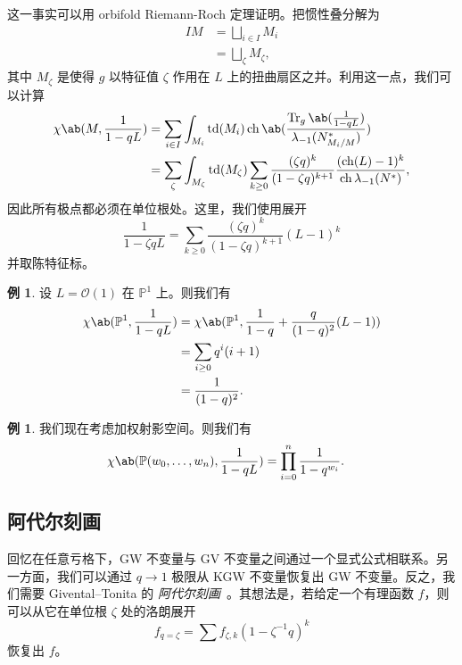 \documentclass{amsart}
\theoremstyle{definition}
\newtheorem{exm}[thm]{例}
\theoremstyle{remark}
\theoremstyle{plain}
\theoremstyle{definition}
\theoremstyle{remark}
\renewcommand{\P}{\mathbb{P}}
\newcommand{\mc}[1]{\mathcal{#1}}
\newcommand{\on}[1]{\operatorname{#1}}
\newcommand{\1}{\mathbf{1}}
\newcommand{\2}{\mathbf{2}}
\newcommand{\3}{\mathbf{3}}
\DeclareMathOperator{\ch}{ch}
\begin{document}
这一事实可以用 orbifold Riemann-Roch 定理证明。把惯性叠分解为
\begin{align*}
    IM &= \bigsqcup_{i \in I} M_i \\
    &= \bigsqcup_{\zeta} M_{\zeta},
\end{align*}
其中 \(M_{\zeta}\) 是使得 \(g\) 以特征值 \(\zeta\) 作用在 \(L\) 上的扭曲扇区之并。利用这一点，我们可以计算
\begin{align*}
    \chi\ab(M, \frac{1}{1-qL}) &= \sum_{i \in I} \int_{M_i} \on{td}(M_i) \on{ch} \ab(\frac{ \on{Tr}_g \ab(\frac{1}{1-qL}) }{\lambda_{-1}(N_{M_i/M}^*)}) \\
    &= \sum_{\zeta} \int_{M_{\zeta}} \on{td}(M_{\zeta}) \sum_{k \geq 0} \frac{(\zeta q)^k}{(1-\zeta q)^{k+1}} \frac{( \on{ch}(L)-1 )^k}{\ch \lambda_{-1}(N^*)},
\end{align*}
因此所有极点都必须在单位根处。这里，我们使用展开
\[ \frac{1}{1-\zeta q L} = \sum_{k \geq 0} \frac{(\zeta q)^k}{(1-\zeta q)^{k+1}} (L-1)^k \]
并取陈特征标。

\begin{exm}
    设 \(L = \mc{O}(1)\) 在 \(\P^1\) 上。则我们有
    \begin{align*}
        \chi\ab(\P^1, \frac{1}{1-qL}) &= \chi\ab(\P^1, \frac{1}{1-q} + \frac{q}{(1-q)^2}(L-1)) \\
        &= \sum_{i \geq 0} q^i (i+1) \\
        &= \frac{1}{(1-q)^2}.
    \end{align*}
\end{exm}

\begin{exm}
    我们现在考虑加权射影空间。则我们有
    \begin{align*}
        \chi\ab(\P(w_0, \ldots, w_n), \frac{1}{1-qL}) &= \prod_{i=0}^n \frac{1}{1-q^{w_i}}. 
    \end{align*}
\end{exm}
\subsection{阿代尔刻画}%
\label{sub:Adelic characterization}

回忆在任意亏格下，GW 不变量与 GV 不变量之间通过一个显式公式相联系。另一方面，我们可以通过 \(q \to 1\) 极限从 KGW 不变量恢复出 GW 不变量。反之，我们需要 Givental--Tonita 的 \textit{阿代尔刻画}~\cite{GiventalTonita2014}。其想法是，若给定一个有理函数 \(f\)，则可以从它在单位根 \(\zeta\) 处的洛朗展开
\[ f_{q=\zeta} = \sum f_{\zeta, k} (1-\zeta^{-1} q)^k \]
恢复出 \(f\)。
\end{document}
